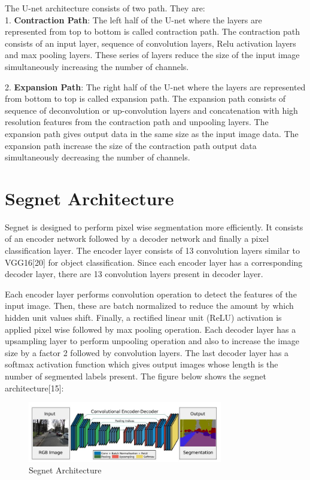 \documentclass{IEEEtran}
\begin{document}
The U-net architecture consists of two path. They are:\\

1. \textbf{Contraction Path}: The left half of the U-net where the layers are represented from top to bottom is called contraction path. The contraction path consists of an input layer, sequence of convolution layers, Relu activation layers and max pooling layers. These series of layers reduce the size of the input image simultaneously increasing the number of channels.


2. \textbf{Expansion Path}: The right half of the U-net where the layers are represented from bottom to top is called expansion path. The expansion path consists of sequence of deconvolution or up-convolution layers and concatenation with high resolution features from the contraction path and unpooling layers. The expansion path gives output data in the same size as the input image data. The expansion path increase the size of the contraction path output data simultaneously decreasing the number of channels.

\section{\textbf{Segnet Architecture}}
Segnet is designed to perform pixel wise segmentation more efficiently. It consists of an encoder network followed by a decoder network and finally a pixel classification layer. The encoder layer consists of 13 convolution layers similar to VGG16[20] for object classification. Since each encoder layer has a corresponding decoder layer, there are 13 convolution layers present in decoder layer.

Each encoder layer performs convolution operation to detect the features of the input image. Then, these are batch normalized to reduce the amount by which hidden unit values shift. Finally, a rectified linear unit (ReLU) activation is applied pixel wise followed by max pooling operation. Each decoder layer has a upsampling layer to perform unpooling operation and also to increase the image size by a factor 2 followed by convolution layers. The last decoder layer has a softmax activation function which gives output images whose length is the number of segmented labels present. The figure below shows the segnet architecture[15]:

\begin{figure}[h]
    \centering
    \captionsetup{justification=centering}
    \includegraphics[width=8.5cm]{segnet}
    \caption{Segnet Architecture}
    \label{fig:Binary class segmented output}
\end{figure}
\end{document}
